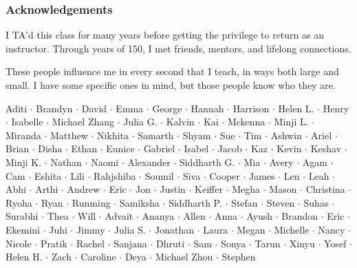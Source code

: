 \documentclass[aspectratio=169, handout]{beamer}
\begin{document}
\begin{frame}[fragile]
  \frametitle{Acknowledgements}

  I TA'd this class for many years before getting the privilege to return as
  an instructor. Through years of 150, I met friends, mentors, and lifelong
  connections.

  \pause
  \vspace{\fill}

  These people influence me in every second that I teach, in ways both large
  and small. I have some specific ones in mind, but those
  people know who they are.

  \pause
  \vspace{\fill}

  \begin{center}
    Aditi $\cdot$
    Brandyn $\cdot$
    David $\cdot$
    Emma $\cdot$
    George $\cdot$
    Hannah $\cdot$
    Harrison $\cdot$
    Helen L. $\cdot$
    Henry $\cdot$
    Isabelle $\cdot$
    Michael Zhang $\cdot$
    Julia G. $\cdot$
    Kalvin $\cdot$
    Kai $\cdot$
    Mckenna $\cdot$
    Minji L. $\cdot$
    Miranda $\cdot$
    Matthew $\cdot$
    Nikhita $\cdot$
    Samarth $\cdot$
    Shyam $\cdot$
    Sue $\cdot$
    Tim $\cdot$
    Ashwin $\cdot$
    Ariel $\cdot$
    Brian $\cdot$
    Disha $\cdot$
    Ethan $\cdot$
    Eunice $\cdot$
    Gabriel $\cdot$
    Isabel $\cdot$
    Jacob $\cdot$
    Kaz $\cdot$
    Kevin $\cdot$
    Keshav $\cdot$
    Minji K. $\cdot$
    Nathan $\cdot$
    Naomi $\cdot$
    Alexander $\cdot$
    Siddharth G. $\cdot$
    Mia $\cdot$
    Avery $\cdot$
    Agam $\cdot$
    Cam $\cdot$
    Eshita $\cdot$
    Lili $\cdot$
    Rahjshiba $\cdot$
    Soumil $\cdot$
    Siva $\cdot$
    Cooper $\cdot$
    James $\cdot$
    Len $\cdot$
    Leah $\cdot$
    Abhi $\cdot$
    Arthi $\cdot$
    Andrew $\cdot$
    Eric $\cdot$
    Jon $\cdot$
    Justin $\cdot$
    Keiffer $\cdot$
    Megha $\cdot$
    Mason $\cdot$
    Christina $\cdot$
    Ryoha $\cdot$
    Ryan $\cdot$
    Runming  $\cdot$
    Samiksha $\cdot$
    Siddharth P. $\cdot$
    Stefan $\cdot$
    Steven $\cdot$
    Suhas $\cdot$
    Surabhi $\cdot$
    Thea $\cdot$
    Will $\cdot$
    Advait $\cdot$
    Ananya $\cdot$
    Allen $\cdot$
    Anna $\cdot$
    Ayush $\cdot$
    Brandon $\cdot$
    Eric $\cdot$
    Ekemini $\cdot$
    Juhi $\cdot$
    Jimmy $\cdot$
    Julia S. $\cdot$
    Jonathan $\cdot$
    Laura $\cdot$
    Megan $\cdot$
    Michelle $\cdot$
    Nancy $\cdot$
    Nicole $\cdot$
    Pratik $\cdot$
    Rachel $\cdot$
    Sanjana $\cdot$
    Dhruti $\cdot$
    Sam $\cdot$
    Sonya $\cdot$
    Tarun $\cdot$
    Xinyu $\cdot$
    Yosef $\cdot$
    Helen H. $\cdot$
    Zach $\cdot$
    Caroline $\cdot$
    Deya $\cdot$
    Michael Zhou $\cdot$
    Stephen
  \end{center}
\end{frame}
\end{document}
